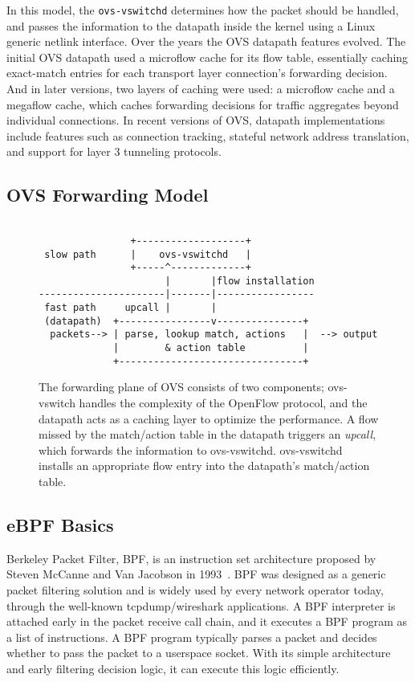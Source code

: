 \documentclass[10pt]{sigplanconf}
\begin{document}
In this model, the \verb+ovs-vswitchd+ determines how the packet should be handled,
and passes the information to the datapath inside the kernel using a
Linux generic netlink interface.  Over the years the OVS datapath features evolved.
The initial OVS datapath used a microflow cache for its flow table,
essentially caching exact-match entries for each
transport layer connection's forwarding decision.  And in later versions,
two layers of caching were used: a microflow cache and a megaflow cache,
which caches forwarding decisions for traffic aggregates beyond individual
connections.  In recent versions of OVS, datapath implementations include
features such as connection tracking, stateful network address translation, and
support for layer 3 tunneling protocols.

\subsection{OVS Forwarding Model}

\begin{figure}
{\scriptsize
\begin{verbatim}
              
                +-------------------+
 slow path      |    ovs-vswitchd   |
                +-----^-------------+
                      |       |flow installation
----------------------|-------|-----------------
 fast path     upcall |       | 
 (datapath)  +----------------v---------------+ 
  packets--> | parse, lookup match, actions   |  --> output
             |        & action table          |
             +--------------------------------+
\end{verbatim}
}
\vspace{-1.0em}
\caption{
The forwarding plane of OVS consists of two components;
ovs-vswitch handles the complexity of the OpenFlow protocol, and the
datapath acts as a caching layer to optimize the performance.  A flow
missed by the match/action table in the datapath triggers an {\em
upcall}, which forwards the information to ovs-vswitchd.  ovs-vswitchd
installs an appropriate flow entry into the datapath's match/action table.}
\label{ovsintro}
\vspace{-1.0em}
\end{figure}

\subsection{eBPF Basics}\label{sec:ebpf}
Berkeley Packet Filter, BPF, is an instruction set architecture
proposed by Steven McCanne and Van Jacobson in 1993~\cite{cbpf}.  
BPF was designed as a generic packet filtering solution and is widely
used by every network operator today, through the well-known tcpdump/wireshark
applications. A BPF interpreter is attached early in the packet receive call
chain, and it executes a BPF program as a list of instructions.
A BPF program typically parses a packet and decides
whether to pass the packet to a userspace socket.  With its simple architecture
and early filtering decision logic, it can execute this logic efficiently.
\end{document}
